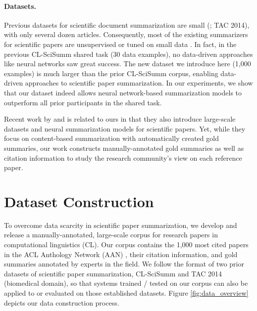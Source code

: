 \documentclass[letterpaper]{article} \usepackage{aaai19}  \usepackage{times}  \usepackage{helvet}  \usepackage{courier}  \usepackage{url}
\begin{document}
\paragraph{Datasets.}
Previous datasets for scientific document summarization
are small (\citeauthor{Teufel:2002:SSA:638178.638180,jaidka2016overview}; TAC 2014), with only several dozen articles.
Consequently, most of the existing summarizers for scientific papers are
unsupervised or tuned on small data \cite{abuJbara&Radev11a,cohan2015sci,clscisumm_sys8}.
In fact, in the previous CL-SciSumm shared task (30 data examples), no data-driven approaches
like
neural networks saw great success.
The new dataset we introduce
here
(1,000 examples) is much larger than the prior CL-SciSumm corpus, enabling data-driven approaches to scientific paper summarization.
In our experiments,
we show that our dataset indeed allows neural network-based summarization models to
outperform all prior participants in the shared task.


Recent work by \citet{collins2017supervised} and \citet{cohan2018discourse} is related to ours in that they also introduce large-scale datasets and neural summarization models for scientific papers. Yet,
while they focus on content-based summarization with automatically created gold summaries, our work constructs manually-annotated gold summaries as well as citation information to study the research community's view on each reference paper.










\section{Dataset Construction}
\label{data_construction}

To overcome data scarcity in scientific paper summarization,
we develop and release a manually-annotated, large-scale corpus for research papers in computational linguistics (CL).
Our corpus contains the 1,000 most cited papers in the ACL Anthology Network (AAN) \cite{aan_2013},
their citation information, and gold summaries annotated by experts in the field.
We follow the format of two prior datasets of scientific paper summarization, CL-SciSumm \cite{jaidka2016overview} and TAC 2014 (biomedical domain),
so that systems trained / tested on our corpus can also be applied to or evaluated on those established datasets.
Figure \ref{fig:data_overview} depicts our data construction process.
\end{document}
